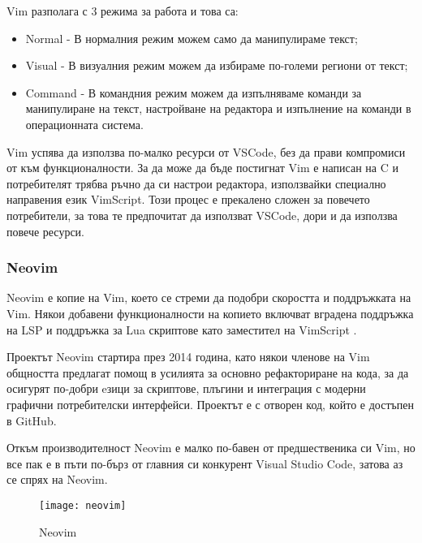 Vim разполага с 3 режима за работа и това са:
\begin{itemize}
\item Normal - В нормалния режим можем само да манипулираме текст;
\item Visual - В визуалния режим можем да избираме по-големи региони от текст;
\item Command - В командния режим можем да изпълняваме команди за манипулиране
на текст, настройване на редактора и изпълнение на команди в операционната
система.
\end{itemize}

Vim успява да използва по-малко ресурси от VSCode, без да прави компромиси от към
функционалности. За да може да бъде постигнат Vim е написан на C и потребителят
трябва ръчно да си настрои редактора, използвайки специално направения език
VimScript. Този процес е прекалено сложен за повечето потребители, за това те
предпочитат да използват VSCode, дори и да използва повече ресурси.

\subsubsection{Neovim}
Neovim е копие на Vim, което се стреми да подобри скоростта и поддръжката на
Vim. Някои добавени функционалности на копието включват вградена поддръжка на
LSP и поддръжка за Lua скриптове като заместител на VimScript \cite{neovim_wikipedia}.

Проектът Neovim стартира през 2014 година, като някои членове на Vim общността
предлагат помощ в усилията за основно рефакториране на кода, за да осигурят по-добри
eзици за скриптове, плъгини и интеграция с модерни графични потребителски интерфейси.
Проектът е с отворен код, който е достъпен в GitHub. \cite{neovim_github}

Откъм производителност Neovim е малко по-бавен от предшественика си Vim, но
все пак е в пъти по-бърз от главния си конкурент Visual Studio Code, затова аз
се спрях на Neovim.

\begin{figure}[!htb]
  \texttt{[image: neovim]}
  \centering
  \caption{Neovim}
  \label{fig:neovim}
\end{figure}

